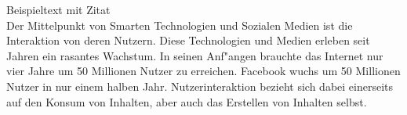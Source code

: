 Beispieltext mit Zitat \\


Der Mittelpunkt von Smarten Technologien und Sozialen Medien ist die Interaktion von deren Nutzern. Diese Technologien und Medien erleben seit Jahren ein rasantes Wachstum. In seinen Anf"angen brauchte das Internet nur vier Jahre um 50 Millionen Nutzer zu erreichen. Facebook wuchs um 50 Millionen Nutzer in nur einem halben Jahr. \cite{Nair2011} Nutzerinteraktion bezieht sich dabei einerseits auf den Konsum von Inhalten, aber auch das Erstellen von Inhalten selbst. \cite{Alt2012}

